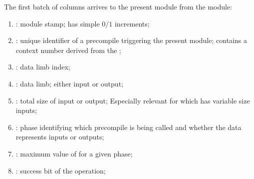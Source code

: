 The first batch of columns arrives to the present module from the \mmioMod{} module:
\begin{enumerate}
      \item \ecDataStamp{}: %
            module stamp; has simple $0/1$ increments;
      \item \ecdataId{}: %
            unique identifier of a precompile  triggering the present module;
            contains a context number derived from the \hubStamp{};
      \item \ecdataIndex{}: %
            data limb index;
      \item \ecdataLimb{}: %
            data limb; either input or output;
      \item \ecdataTotalSize{}: %
            total size of input or output; Especially relevant for  which has variable size inputs;
      \item \ecdataPhase{}: %
            phase identifying which precompile is being called and whether the data represents inputs or outputs;
      \item \indexMax{}: %
            maximum value of \ecdataIndex{} for a given phase;
      \item \ecdataSuccessBit{} \hubMmuMmioPrediction{} \markAsPartiallyJustifiedHere{}:
            success bit of the operation;
\end{enumerate}

